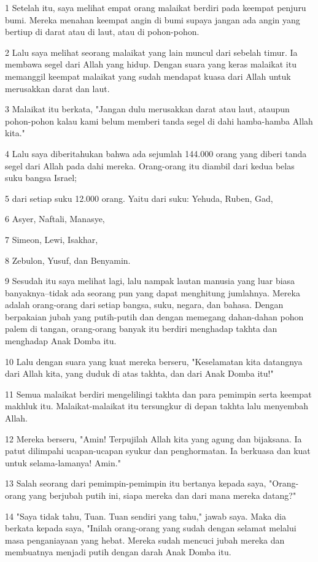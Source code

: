 \par 1 Setelah itu, saya melihat empat orang malaikat berdiri pada keempat penjuru bumi. Mereka menahan keempat angin di bumi supaya jangan ada angin yang bertiup di darat atau di laut, atau di pohon-pohon.
\par 2 Lalu saya melihat seorang malaikat yang lain muncul dari sebelah timur. Ia membawa segel dari Allah yang hidup. Dengan suara yang keras malaikat itu memanggil keempat malaikat yang sudah mendapat kuasa dari Allah untuk merusakkan darat dan laut.
\par 3 Malaikat itu berkata, "Jangan dulu merusakkan darat atau laut, ataupun pohon-pohon kalau kami belum memberi tanda segel di dahi hamba-hamba Allah kita."
\par 4 Lalu saya diberitahukan bahwa ada sejumlah 144.000 orang yang diberi tanda segel dari Allah pada dahi mereka. Orang-orang itu diambil dari kedua belas suku bangsa Israel;
\par 5 dari setiap suku 12.000 orang. Yaitu dari suku: Yehuda, Ruben, Gad,
\par 6 Asyer, Naftali, Manasye,
\par 7 Simeon, Lewi, Isakhar,
\par 8 Zebulon, Yusuf, dan Benyamin.
\par 9 Sesudah itu saya melihat lagi, lalu nampak lautan manusia yang luar biasa banyaknya--tidak ada seorang pun yang dapat menghitung jumlahnya. Mereka adalah orang-orang dari setiap bangsa, suku, negara, dan bahasa. Dengan berpakaian jubah yang putih-putih dan dengan memegang dahan-dahan pohon palem di tangan, orang-orang banyak itu berdiri menghadap takhta dan menghadap Anak Domba itu.
\par 10 Lalu dengan suara yang kuat mereka berseru, "Keselamatan kita datangnya dari Allah kita, yang duduk di atas takhta, dan dari Anak Domba itu!"
\par 11 Semua malaikat berdiri mengelilingi takhta dan para pemimpin serta keempat makhluk itu. Malaikat-malaikat itu tersungkur di depan takhta lalu menyembah Allah.
\par 12 Mereka berseru, "Amin! Terpujilah Allah kita yang agung dan bijaksana. Ia patut dilimpahi ucapan-ucapan syukur dan penghormatan. Ia berkuasa dan kuat untuk selama-lamanya! Amin."
\par 13 Salah seorang dari pemimpin-pemimpin itu bertanya kepada saya, "Orang-orang yang berjubah putih ini, siapa mereka dan dari mana mereka datang?"
\par 14 "Saya tidak tahu, Tuan. Tuan sendiri yang tahu," jawab saya. Maka dia berkata kepada saya, "Inilah orang-orang yang sudah dengan selamat melalui masa penganiayaan yang hebat. Mereka sudah mencuci jubah mereka dan membuatnya menjadi putih dengan darah Anak Domba itu.
